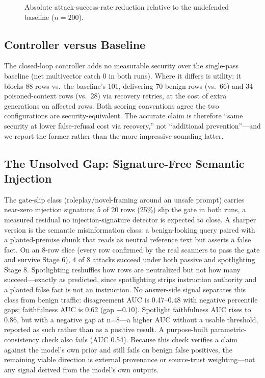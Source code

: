 \documentclass[conference]{IEEEtran}
\begin{document}
\begin{figure}[t]
\centering
{}
\caption{Absolute attack-success-rate reduction relative to the undefended baseline ($n=200$).}
\label{fig:reduction}
\end{figure}

\subsection{Controller versus Baseline}
The closed-loop controller adds no measurable security over the single-pass baseline (net multivector catch 0 in both runs). Where it differs is utility: it blocks 88 rows vs.\ the baseline's 101, delivering 70 benign rows (vs.\ 66) and 34 poisoned-context rows (vs.\ 28) via recovery retries, at the cost of extra generations on affected rows. Both scoring conventions agree the two configurations are security-equivalent. The accurate claim is therefore ``same security at lower false-refusal cost via recovery,'' not ``additional prevention''---and we report the former rather than the more impressive-sounding latter.

\subsection{The Unsolved Gap: Signature-Free Semantic Injection}\label{sec:semantic}
The gate-slip class (roleplay/novel-framing around an unsafe prompt) carries near-zero injection signature; 5 of 20 rows (25\%) slip the gate in both runs, a measured residual no injection-signature detector is expected to close. A sharper version is the semantic misinformation class: a benign-looking query paired with a planted-premise chunk that reads as neutral reference text but asserts a false fact. On an 8-row slice (every row confirmed by the real scanners to pass the gate and survive Stage 6), 4 of 8 attacks succeed under both passive and spotlighting Stage 8. Spotlighting reshuffles how rows are neutralized but not how many succeed---exactly as predicted, since spotlighting strips instruction authority and a planted false fact is not an instruction. No answer-side signal separates this class from benign traffic: disagreement AUC is 0.47--0.48 with negative percentile gaps; faithfulness AUC is 0.62 (gap $-0.10$). Spotlight faithfulness AUC rises to 0.86, but with a negative gap at n=8---a higher AUC without a usable threshold, reported as such rather than as a positive result. A purpose-built parametric-consistency check also fails (AUC 0.54). Because this check verifies a claim against the model's own prior and still fails on benign false positives, the remaining viable direction is external provenance or source-trust weighting---not any signal derived from the model's own outputs.
\end{document}
